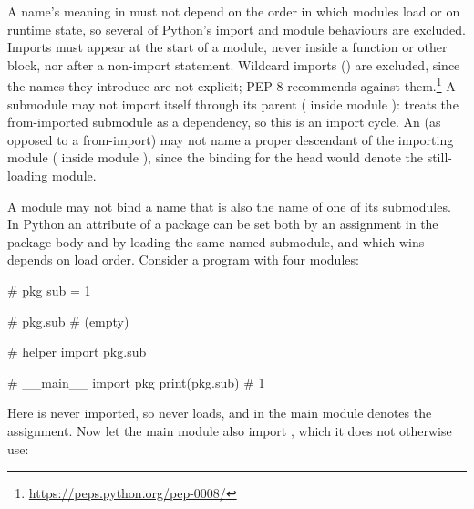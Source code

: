A name's meaning in \PurePy must not depend on the order in which modules load or on runtime state, so several
of Python's import and module behaviours are excluded. Imports must appear at the start of a module, never
inside a function or other block, nor after a non-import statement. Wildcard imports () are excluded, since the names they introduce are not explicit; PEP 8 recommends against
them.\footnote{\url{https://peps.python.org/pep-0008/}} A submodule may not import itself through its parent
( inside module ): \PurePy treats the from-imported submodule as a
dependency, so this is an import cycle. An  (as opposed to a from-import) may not name a proper
descendant of the importing module ( inside module ), since the binding for
the head would denote the still-loading module.

A module may not bind a name that is also the name of one of its submodules. In Python an attribute of a
package can be set both by an assignment in the package body and by loading the same-named submodule, and which
wins depends on load order. Consider a program with four modules:

\begin{minipage}[t]{0.2\textwidth}
\begin{python}
# pkg
sub = 1
\end{python}
\end{minipage}
\hfill
\begin{minipage}[t]{0.2\textwidth}
\begin{python}
# pkg.sub
# (empty)
\end{python}
\end{minipage}
\hfill
\begin{minipage}[t]{0.25\textwidth}
\begin{python}
# helper
import pkg.sub
\end{python}
\end{minipage}
\hfill
\begin{minipage}[t]{0.28\textwidth}
\begin{python}
# __main__
import pkg
print(pkg.sub)  # 1
\end{python}
\end{minipage}

Here  is never imported, so  never loads, and  in the
main module denotes the assignment. Now let the main module also import , which it does not
otherwise use:

